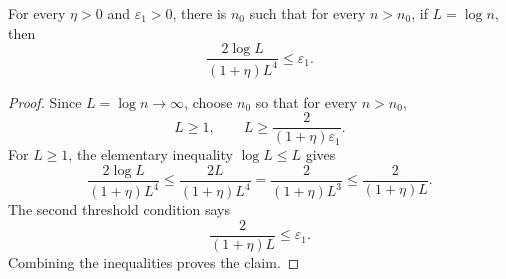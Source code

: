 \begin{helper}
For every \(\eta>0\) and \(\varepsilon_1>0\), there is \(n_0\) such that
for every \(n>n_0\), if \(L=\log n\), then
\[
\frac{2\log L}{(1+\eta)L^4}\le\varepsilon_1.
\]
\end{helper}
\begin{proof}
Since \(L=\log n\to\infty\), choose \(n_0\) so that for every \(n>n_0\),
\[
L\ge 1,\qquad L\ge \frac{2}{(1+\eta)\varepsilon_1}.
\]
For \(L\ge1\), the elementary inequality \(\log L\le L\) gives
\[
\frac{2\log L}{(1+\eta)L^4}
\le \frac{2L}{(1+\eta)L^4}
=\frac{2}{(1+\eta)L^3}
\le\frac{2}{(1+\eta)L}.
\]
The second threshold condition says
\[
\frac{2}{(1+\eta)L}\le\varepsilon_1.
\]
Combining the inequalities proves the claim.
\end{proof}
